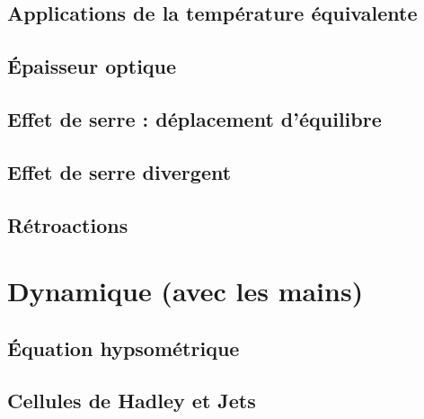 \documentclass[
        a4paper,
        DIV16,
        10pt,
        cleardoublepage=empty,
        twoside=yes,
        BCOR=8.25mm
        ]{scrbook}
\begin{document}
\newpage
\section{Applications de la température équivalente}


\newpage
\section{\'Epaisseur optique}


%
%
%
%
%
%

\newpage
\section{Effet de serre : déplacement d'équilibre}


\newpage
\section{Effet de serre divergent}


\newpage
\section{Rétroactions}


\chapter{Dynamique (avec les mains)}

\newpage
\section{\'Equation hypsométrique}


\newpage
\section{Cellules de Hadley et Jets}

\end{document}
